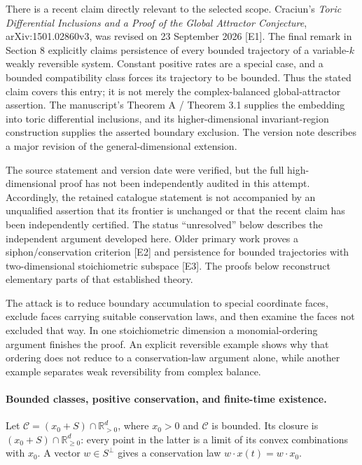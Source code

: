 \documentclass[11pt]{article}
\begin{document}
There is a recent claim directly relevant to the selected scope. Craciun's
\emph{Toric Differential Inclusions and a Proof of the Global Attractor
Conjecture}, arXiv:1501.02860v3, was revised on 23 September 2026 [E1].
The final remark in Section 8 explicitly claims persistence of every
bounded trajectory of a variable-$k$ weakly reversible system. Constant
positive rates are a special case, and a bounded compatibility class
forces its trajectory to be bounded. Thus the stated claim covers this
entry; it is not merely the complex-balanced global-attractor assertion.
The manuscript's Theorem A / Theorem 3.1 supplies the embedding into toric
differential inclusions, and its higher-dimensional invariant-region
construction supplies the asserted boundary exclusion. The version note
describes a major revision of the general-dimensional extension.

The source statement and version date were verified, but the full
high-dimensional proof has not been independently audited in this
attempt. Accordingly, the retained catalogue statement is not accompanied
by an unqualified assertion that its frontier is unchanged or that the
recent claim has been independently certified. The status ``unresolved''
below describes the independent argument developed here. Older primary
work proves a siphon/conservation criterion [E2] and persistence for
bounded trajectories with two-dimensional stoichiometric subspace [E3].
The proofs below reconstruct elementary parts of that established theory.

The attack is to reduce boundary accumulation to special coordinate
faces, exclude faces carrying suitable conservation laws, and then examine
the faces not excluded that way. In one stoichiometric dimension a
monomial-ordering argument finishes the proof. An explicit reversible
example shows why that ordering does not reduce to a conservation-law
argument alone, while another example separates weak reversibility from
complex balance.

\paragraph{Bounded classes, positive conservation, and finite-time existence.}
Let $\mathcal C=(x_0+S)\cap\mathbb R_{>0}^d$, where $x_0>0$ and
$\mathcal C$ is bounded. Its closure is
$(x_0+S)\cap\mathbb R_{\geq0}^d$: every point in the latter is a limit
of its convex combinations with $x_0$. A vector $w\in S^\perp$ gives a
conservation law $w\cdot x(t)=w\cdot x_0$.
\end{document}

